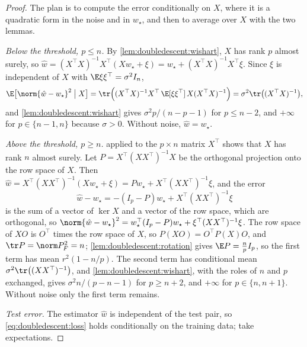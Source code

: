 \begin{refsection}
\begin{proof}
The plan is to compute the error conditionally on $X$, where it is a quadratic form in the noise and in $w_\star$, and then to average over $X$ with the two lemmas.

\emph{Below the threshold, $p\le n$.} By \cref{lem:doubledescent:wishart}, $X$ has rank $p$ almost surely, so $\hat w=(X^\top X)^{-1}X^\top(Xw_\star+\xi)=w_\star+(X^\top X)^{-1}X^\top\xi$. Since $\xi$ is independent of $X$ with $\E\xi\xi^\top=\sigma^2I_n$,
\[
  \E\bigl[\norm{\hat w-w_\star}^2\bigm| X\bigr]=\tr\Bigl((X^\top X)^{-1}X^\top\,\E[\xi\xi^\top]\,X(X^\top X)^{-1}\Bigr)=\sigma^2\tr\bigl((X^\top X)^{-1}\bigr),
\]
and \cref{lem:doubledescent:wishart} gives $\sigma^2p/(n-p-1)$ for $p\le n-2$, and $+\infty$ for $p\in\{n-1,n\}$ because $\sigma>0$. Without noise, $\hat w=w_\star$.

\emph{Above the threshold, $p\ge n$.}  applied to the $p\times n$ matrix $X^\top$ shows that $X$ has rank $n$ almost surely. Let $P=X^\top(XX^\top)^{-1}X$ be the orthogonal projection onto the row space of $X$. Then $\hat w=X^\top(XX^\top)^{-1}(Xw_\star+\xi)=Pw_\star+X^\top(XX^\top)^{-1}\xi$, and the error
\[
  \hat w-w_\star=-(I_p-P)w_\star+X^\top(XX^\top)^{-1}\xi
\]
is the sum of a vector of $\ker X$ and a vector of the row space, which are orthogonal, so $\norm{\hat w-w_\star}^2=w_\star^\top(I_p-P)w_\star+\xi^\top(XX^\top)^{-1}\xi$. The row space of $XO$ is $O^\top$ times the row space of $X$, so $P(XO)=O^\top P(X)O$, and $\tr P=\norm P_F^2=n$; \cref{lem:doubledescent:rotation} gives $\E P=\frac npI_p$, so the first term has mean $r^2(1-n/p)$. The second term has conditional mean $\sigma^2\tr\bigl((XX^\top)^{-1}\bigr)$, and \cref{lem:doubledescent:wishart}, with the roles of $n$ and $p$ exchanged, gives $\sigma^2n/(p-n-1)$ for $p\ge n+2$, and $+\infty$ for $p\in\{n,n+1\}$. Without noise only the first term remains.

\emph{Test error.} The estimator $\hat w$ is independent of the test pair, so \eqref{eq:doubledescent:loss} holds conditionally on the training data; take expectations.
\end{proof}



\end{refsection}
